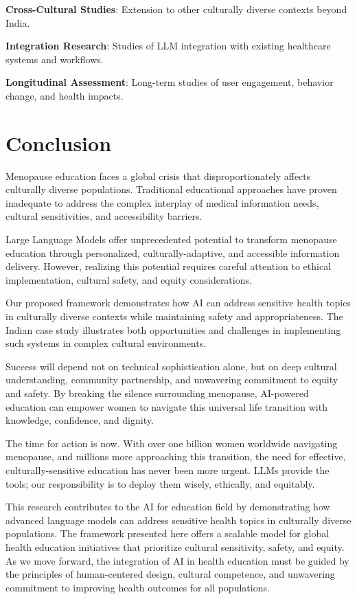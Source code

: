 \documentclass[letterpaper]{article} %
\begin{document}
\textbf{Cross-Cultural Studies}: Extension to other culturally diverse contexts beyond India.

\textbf{Integration Research}: Studies of LLM integration with existing healthcare systems and workflows.

\textbf{Longitudinal Assessment}: Long-term studies of user engagement, behavior change, and health impacts.

\section{Conclusion}

Menopause education faces a global crisis that disproportionately affects culturally diverse populations. Traditional educational approaches have proven inadequate to address the complex interplay of medical information needs, cultural sensitivities, and accessibility barriers.

Large Language Models offer unprecedented potential to transform menopause education through personalized, culturally-adaptive, and accessible information delivery. However, realizing this potential requires careful attention to ethical implementation, cultural safety, and equity considerations.

Our proposed framework demonstrates how AI can address sensitive health topics in culturally diverse contexts while maintaining safety and appropriateness. The Indian case study illustrates both opportunities and challenges in implementing such systems in complex cultural environments.

Success will depend not on technical sophistication alone, but on deep cultural understanding, community partnership, and unwavering commitment to equity and safety. By breaking the silence surrounding menopause, AI-powered education can empower women to navigate this universal life transition with knowledge, confidence, and dignity.

The time for action is now. With over one billion women worldwide navigating menopause, and millions more approaching this transition, the need for effective, culturally-sensitive education has never been more urgent. LLMs provide the tools; our responsibility is to deploy them wisely, ethically, and equitably.

This research contributes to the AI for education field by demonstrating how advanced language models can address sensitive health topics in culturally diverse populations. The framework presented here offers a scalable model for global health education initiatives that prioritize cultural sensitivity, safety, and equity. As we move forward, the integration of AI in health education must be guided by the principles of human-centered design, cultural competence, and unwavering commitment to improving health outcomes for all populations.


\end{document}
